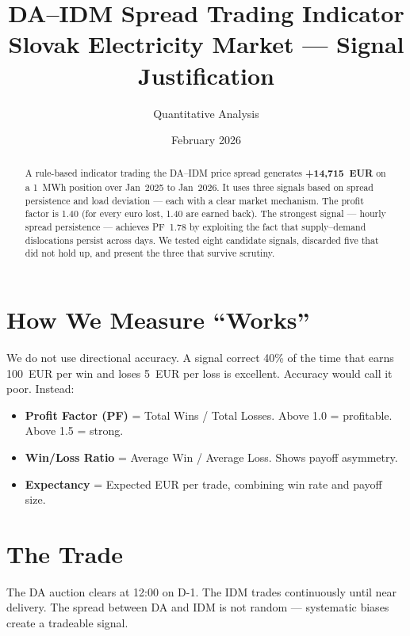 \documentclass[11pt,a4paper]{article}
\title{\textbf{DA--IDM Spread Trading Indicator}\\[0.3em]
\large Slovak Electricity Market --- Signal Justification}
\author{Quantitative Analysis}
\date{February 2026}
\begin{document}
\maketitle

\begin{abstract}
A rule-based indicator trading the DA--IDM price spread generates \textbf{+14,715~EUR} on a 1~MWh position over Jan~2025 to Jan~2026. It uses three signals based on spread persistence and load deviation --- each with a clear market mechanism. The profit factor is 1.40 (for every euro lost, 1.40 are earned back). The strongest signal --- hourly spread persistence --- achieves PF~1.78 by exploiting the fact that supply--demand dislocations persist across days. We tested eight candidate signals, discarded five that did not hold up, and present the three that survive scrutiny.
\end{abstract}

\tableofcontents
\newpage

\section{How We Measure ``Works''}

We do not use directional accuracy. A signal correct 40\% of the time that earns 100~EUR per win and loses 5~EUR per loss is excellent. Accuracy would call it poor. Instead:

\begin{itemize}[leftmargin=*]
\item \textbf{Profit Factor (PF)} = Total Wins / Total Losses. Above 1.0 = profitable. Above 1.5 = strong.
\item \textbf{Win/Loss Ratio} = Average Win / Average Loss. Shows payoff asymmetry.
\item \textbf{Expectancy} = Expected EUR per trade, combining win rate and payoff size.
\end{itemize}

\section{The Trade}

The DA auction clears at 12:00 on D-1. The IDM trades continuously until near delivery. The spread between DA and IDM is not random --- systematic biases create a tradeable signal.
\end{document}
